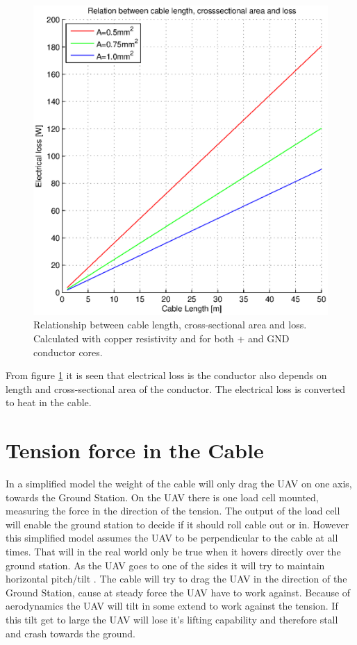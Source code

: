 \begin{figure}[hbtp]
\centering
\includegraphics[scale=0.6]{graphics/matlab/cable_relation_lenght_loss_crosssection.eps}
\caption[Relationship between cable length, cross-sectional area and cable loss.]{Relationship between cable length, cross-sectional area and loss. Calculated with copper resistivity and for both + and GND conductor cores.}
\label{fig:relationship_loss_length}
\end{figure}

\noindent
From figure \ref{fig:relationship_loss_length} it is seen that electrical loss is the conductor also depends on length and cross-sectional area of the conductor. The electrical loss is converted to heat in the cable.


\section{Tension force in the Cable}
In a simplified model the weight of the cable will only drag the UAV on one axis, towards the Ground Station. On the UAV there is one load cell mounted, measuring the force in the direction of the tension. The output of the load cell will enable the ground station to decide if it should roll cable out or in. However this simplified model assumes the UAV to be perpendicular to the cable at all times. 
That will in the real world only be true when it hovers directly over the ground station. As the UAV goes to one of the sides it will try to maintain horizontal pitch/tilt . The cable will try to drag the UAV in the direction of the Ground Station, cause at steady force the UAV have to work against. Because of aerodynamics the UAV will tilt in some extend to work against the tension. If this tilt get to large the UAV will lose it's lifting capability and therefore stall and crash towards the ground.   

